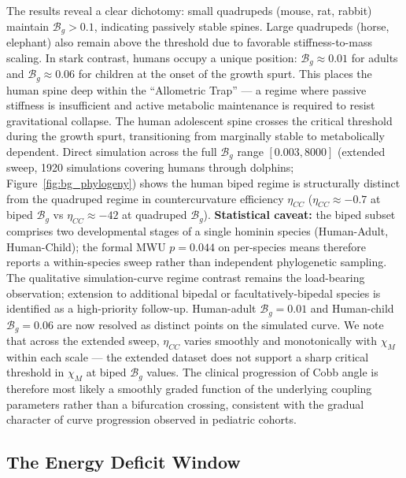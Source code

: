 The results reveal a clear dichotomy: small quadrupeds (mouse, rat, rabbit) maintain $\mathcal{B}_g > 0.1$, indicating passively stable spines. Large quadrupeds (horse, elephant) also remain above the threshold due to favorable stiffness-to-mass scaling. In stark contrast, humans occupy a unique position: $\mathcal{B}_g \approx 0.01$ for adults and $\mathcal{B}_g \approx 0.06$ for children at the onset of the growth spurt. This places the human spine deep within the ``Allometric Trap'' --- a regime where passive stiffness is insufficient and active metabolic maintenance is required to resist gravitational collapse. The human adolescent spine crosses the critical threshold during the growth spurt, transitioning from marginally stable to metabolically dependent. Direct simulation across the full $\mathcal{B}_g$ range $[0.003, 8000]$ (extended sweep, 1920 simulations covering humans through dolphins; Figure~\ref{fig:bg_phylogeny}) shows the human biped regime is structurally distinct from the quadruped regime in countercurvature efficiency $\eta_{CC}$ ($\eta_{CC} \approx -0.7$ at biped $\mathcal{B}_g$ vs $\eta_{CC} \approx -42$ at quadruped $\mathcal{B}_g$). \textbf{Statistical caveat:} the biped subset comprises two developmental stages of a single hominin species (Human-Adult, Human-Child); the formal MWU $p=0.044$ on per-species means therefore reports a within-species sweep rather than independent phylogenetic sampling. The qualitative simulation-curve regime contrast remains the load-bearing observation; extension to additional bipedal or facultatively-bipedal species is identified as a high-priority follow-up. Human-adult $\mathcal{B}_g = 0.01$ and Human-child $\mathcal{B}_g = 0.06$ are now resolved as distinct points on the simulated curve. We note that across the extended sweep, $\eta_{CC}$ varies smoothly and monotonically with $\chi_M$ within each scale --- the extended dataset does not support a sharp critical threshold in $\chi_M$ at biped $\mathcal{B}_g$ values. The clinical progression of Cobb angle is therefore most likely a smoothly graded function of the underlying coupling parameters rather than a bifurcation crossing, consistent with the gradual character of curve progression observed in pediatric cohorts.

\subsection{The Energy Deficit Window}

